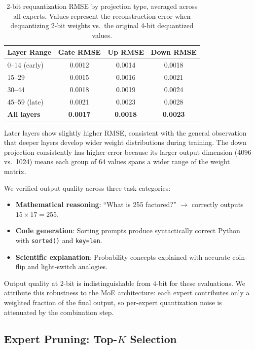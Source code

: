 \documentclass[11pt,twocolumn]{article}
\begin{document}
\begin{table}[h!]
\centering
\small
\caption{2-bit requantization RMSE by projection type, averaged across all experts. Values represent the reconstruction error when dequantizing 2-bit weights vs.\ the original 4-bit dequantized values.}
\label{tab:rmse}
\begin{tabular}{@{}lccc@{}}
\toprule
\textbf{Layer Range} & \textbf{Gate RMSE} & \textbf{Up RMSE} & \textbf{Down RMSE} \\
\midrule
0--14 (early) & 0.0012 & 0.0014 & 0.0018 \\
15--29 & 0.0015 & 0.0016 & 0.0021 \\
30--44 & 0.0018 & 0.0019 & 0.0024 \\
45--59 (late) & 0.0021 & 0.0023 & 0.0028 \\
\midrule
\textbf{All layers} & \textbf{0.0017} & \textbf{0.0018} & \textbf{0.0023} \\
\bottomrule
\end{tabular}
\end{table}

Later layers show slightly higher RMSE, consistent with the general observation that deeper layers develop wider weight distributions during training.
The down projection consistently has higher error because its larger output dimension (4096 vs.\ 1024) means each group of 64 values spans a wider range of the weight matrix.

We verified output quality across three task categories:
\begin{itemize}[leftmargin=*,itemsep=2pt]
    \item \textbf{Mathematical reasoning}: ``What is 255 factored?'' $\to$ correctly outputs $15 \times 17 = 255$.
    \item \textbf{Code generation}: Sorting prompts produce syntactically correct Python with \texttt{sorted()} and \texttt{key=len}.
    \item \textbf{Scientific explanation}: Probability concepts explained with accurate coin-flip and light-switch analogies.
\end{itemize}

Output quality at 2-bit is indistinguishable from 4-bit for these evaluations.
We attribute this robustness to the MoE architecture: each expert contributes only a weighted fraction of the final output, so per-expert quantization noise is attenuated by the combination step.

\subsection{Expert Pruning: Top-$K$ Selection}
\end{document}
